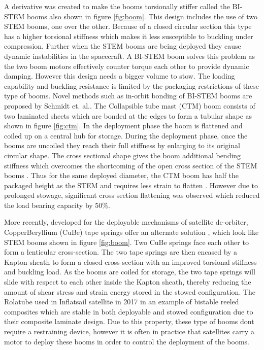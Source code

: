 A derivative was created to make the booms torsionally stiffer called the BI-STEM booms also shown in figure \ref{fig:boom}. This design includes the use of two STEM booms, one over the other. Because of a closed circular section this type has a higher torsional stiffness which makes it less susceptible to buckling under compression. Further when the STEM booms are being deployed they cause dynamic instabilities in the spacecraft. A BI-STEM boom solves this problem as the two boom motors effectively counter torque each other to provide dynamic damping\cite{Thomson2018}. However this design needs a bigger volume to stow. The loading capability and buckling resistance is limited by the packaging restrictions of these type of booms. Novel methods such as in-orbit bonding of BI-STEM booms are proposed by Schmidt et. al.\cite{Tilo}. 
The Collapsible tube mast (CTM) boom \cite{dlr} consists of two laminated sheets which are bonded at the edges to form a tubular shape as shown in figure \ref{fig:ctm}. In the deployment phase the boom is flattened and coiled up on a central hub for storage. During the deployment phase, once the booms are uncoiled they reach their full stiffness by enlarging to its original circular shape. The cross sectional shape gives the boom additional bending stiffness which overcomes the shortcoming of the open cross section of the STEM booms \cite{Fernandez2017}. Thus for the same deployed diameter, the CTM boom has half the packaged height as the STEM and requires less strain to flatten \cite{Murphey2011}. However due to prolonged stowage, significant cross section flattening was observed \cite{Fernandez2017} which reduced the load bearing capacity by 50\%. 
\par
More recently, developed for the deployable mechanisms of satellite de-orbiter, CopperBeryllium (CuBe) tape springs offer an alternate solution \cite{Fernandez2013}, which look like STEM booms shown in figure \ref{fig:boom}. Two CuBe springs face each other to form a lenticular cross-section. The two tape springs are then encased by a Kapton sheath to form a closed cross-section with an improved torsional stiffness and buckling load. As the booms are coiled for storage, the two tape springs will slide with respect to each other inside the Kapton sheath, thereby reducing the amount of shear stress and strain energy stored in the stowed configuration. \cite{Fernandez2013}
The Rolatube used in Inflatsail satellite in 2017\cite{Rolatube} in an example of bistable reeled composites which are stable in both deployable and stowed configuration due to their composite laminate design. Due to this property, these type of booms dont require a restraining device, however it is often in practice that satellites carry a motor to deploy these booms in order to control the deployment of the booms. 
